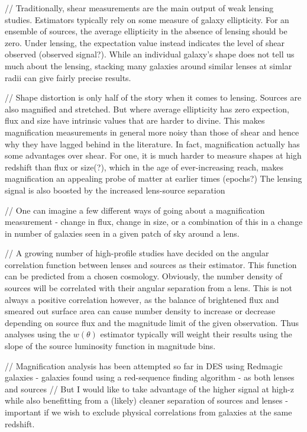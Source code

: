 \documentclass[12pt]{article}
\begin{document}
// Traditionally, shear measurements are the main output of weak lensing studies. Estimators typically rely on some measure of galaxy ellipticity. For an ensemble of sources, the average ellipticity in the absence of lensing should be zero. Under lensing, the expectation value instead indicates the level of shear observed (observed signal?). While an individual galaxy's shape does not tell us much about the lensing, stacking many galaxies around similar lenses at simlar radii can give fairly precise results. %

// Shape distortion is only half of the story when it comes to lensing. Sources are also magnified and stretched. But where average ellipticity has zero expection, flux and size have intrinsic values that are harder to divine. This makes magnification measurements in general more noisy than those of shear and hence why they have lagged behind in the literature. In fact, magnification actually has some advantages over shear. For one, it is much harder to measure shapes at high redshift than flux or size(?), which in the age of ever-increasing reach, makes magnification an appealing probe of matter at earlier times (epochs?) The lensing signal is also boosted by the increased lens-source separation %

// One can imagine a few different ways of going about a magnification measurement - change in flux, change in size, or a combination of this in a change in number of galaxies seen in a given patch of sky around a lens. %

// A growing number of high-profile studies have decided on the angular correlation function between lenses and sources as their estimator. This function can be predicted from a chosen cosmology. Obviously, the number density of sources will be correlated with their angular separation from a lens. This is not always a positive correlation however, as the balance of brightened flux and smeared out surface area can cause number density to increase or decrease depending on source flux and the magnitude limit of the given observation. Thus analyses using the $w(\theta)$ estimator typically will weight their results using the slope of the source luminosity function in magnitude bins. %

// Magnification analysis has been attempted so far in DES using Redmagic galaxies - galaxies found using a red-sequence finding algorithm - as both lenses and sources %
// But I would like to take advantage of the higher signal at high-z while also benefitting from a (likely) cleaner separation of sources and lenses - important if we wish to exclude physical correlations from galaxies at the same redshift. 
\end{document}
